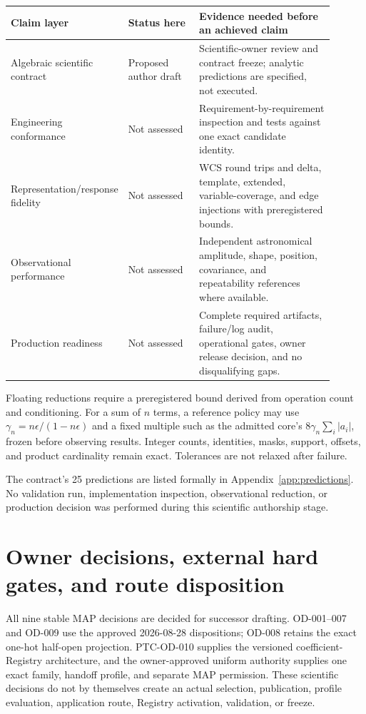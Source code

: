 \documentclass[10pt]{article}
\newcommand{\ClaimNo}{\textcolor{MapGray}{Not assessed}}
\begin{document}
\begin{longtable}{L{0.26\linewidth}L{0.22\linewidth}L{0.42\linewidth}}
\toprule
Claim layer & Status here & Evidence needed before an achieved claim\\
\midrule
Algebraic scientific contract & Proposed author draft & Scientific-owner
review and contract freeze; analytic predictions are specified, not executed.\\
Engineering conformance & \ClaimNo & Requirement-by-requirement inspection and
tests against one exact candidate identity.\\
Representation/response fidelity & \ClaimNo & WCS round trips and delta,
template, extended, variable-coverage, and edge injections with preregistered
bounds.\\
Observational performance & \ClaimNo & Independent astronomical amplitude,
shape, position, covariance, and repeatability references where available.\\
Production readiness & \ClaimNo & Complete required artifacts, failure/log
audit, operational gates, owner release decision, and no disqualifying gaps.\\
\bottomrule
\end{longtable}

Floating reductions require a preregistered bound derived from operation count
and conditioning. For a sum of \(n\) terms, a reference policy may use
\(\gamma_n=n\epsilon/(1-n\epsilon)\) and a fixed multiple such as the admitted
core's \(8\gamma_n\sum_i|a_i|\), frozen before observing results. Integer
counts, identities, masks, support, offsets, and product cardinality remain
exact. Tolerances are not relaxed after failure.

The contract's 25 predictions are listed formally in
Appendix~\ref{app:predictions}. No validation run, implementation inspection,
observational reduction, or production decision was performed during this
scientific authorship stage.

\clearpage
\section{Owner decisions, external hard gates, and route disposition}

All nine stable MAP decisions are decided for successor drafting. OD-001--007
and OD-009 use the approved 2026-08-28 dispositions; OD-008 retains the exact
one-hot half-open projection. PTC-OD-010 supplies the versioned coefficient-
Registry architecture, and the owner-approved uniform authority supplies one
exact family, handoff profile, and separate MAP permission. These scientific
decisions do not by themselves create an actual selection, publication,
profile evaluation, application route, Registry activation, validation, or
freeze.
\end{document}
